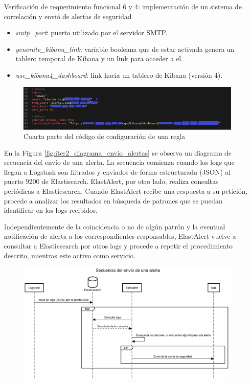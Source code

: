 \begin{section}{Verificación de requerimiento funcional 6 y 4: implementación de un sistema de correlación y envió de alertas de seguridad}
\begin{itemize}
        \item \textit{smtp\_port}: puerto utilizado por el servidor SMTP.
        \item \textit{generate\_kibana\_link}: variable booleana que de estar activada genera un tablero temporal de Kibana y un link para acceder a el.
        \item \textit{use\_kibana4\_dashboard}: link hacia un tablero de Kibana (versión 4).
    \end{itemize}
    \begin{figure}[H]
    \centering
        \includegraphics[width=1\textwidth]{./iteracion_2_imagenes/6-codigoAlerta4.png}
        \caption{Cuarta parte del código de configuración de una regla}
        \label{fig:iter2_4_codigo}
    \end{figure}
    En la Figura \ref{fig:iter2_diagrama_envio_alertas} se observa un diagrama de secuencia del envío de una alerta.
    La secuencia comienza cuando los logs que llegan a Logstash son filtrados y enviados de forma estructurada (JSON) al puerto 9200 de Elastisearch. ElastAlert, por otro lado, realiza consultas periódicas a Elasticsearch. Cuando ElastAlert recibe una respuesta a su petición, procede a analizar los resultados en búsqueda de patrones que se puedan identificar en los logs recibidos. \par
    Independientemente de la coincidencia o no de algún patrón y la eventual notificación de alerta a los correspondientes responsables, ElastAlert vuelve a consultar a Elasticsearch por otros logs y procede a repetir el procedimiento descrito, mientras este activo como servicio.\par 
    \begin{figure}[H]
    \centering
        \includegraphics[width=1\textwidth]{./iteracion_2_imagenes/2-diagrama-de-secuencia-envio-alerta.png}

\end{figure}
\end{section}
